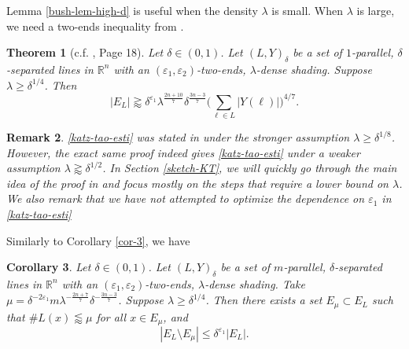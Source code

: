 \documentclass{amsart}
\numberwithin{equation}{section}
\newtheorem{theorem}{Theorem}[section]
\newtheorem{remark}[theorem]{Remark}
\newtheorem{corollary}[theorem]{Corollary}
\newcommand{\de}{\delta}
\newcommand{\e}{\varepsilon}
\newcommand{\la}{\lambda}
\newcommand{\ZR}{\mathbb{R}}
\begin{document}
Lemma \ref{bush-lem-high-d} is useful when the density $\la$ is small. 
When $\la$ is large, we need a two-ends inequality from \cite{Katz-Tao-Kakeya-maximal}.
\begin{theorem}[c.f. \cite{Katz-Tao-Kakeya-maximal}, Page 18]
\label{katz-tao-thm}
Let $\de\in(0,1)$.
Let $(L,Y)_\de$ be a set of $1$-parallel, $\de$-separated lines in $\ZR^n$ with an $(\e_1, \e_2)$-two-ends, $\la$-dense shading. 
Suppose $\la\geq \de^{1/4}$.
Then
\begin{equation}
\label{katz-tao-esti}
    |E_L|\gtrapprox \de^{\e_1} \la^\frac{2n+10}{7}\de^{\frac{3n-3}{7}}\Big(\sum_{\ell\in L}|Y(\ell)|\Big)^{4/7}.
\end{equation}
\end{theorem}
\begin{remark}
\rm
\eqref{katz-tao-esti} was stated in \cite{Katz-Tao-Kakeya-maximal} under the stronger assumption $\la\geq \de^{1/8}$.
However, the exact same proof indeed gives \eqref{katz-tao-esti} under a weaker assumption $\la\gtrapprox\de^{1/2}$. 
In Section \ref{sketch-KT}, we will quickly go through the main idea of the proof in \cite{Katz-Tao-Kakeya-maximal} and focus mostly on the steps that require a lower bound on $\la$.
We also remark that we have not attempted to optimize the dependence on $\e_1$ in \eqref{katz-tao-esti}
\end{remark}

Similarly to Corollary \ref{cor-3}, we have
\begin{corollary}
\label{cor-4}
Let $\de\in(0,1)$.
Let $(L,Y)_\de$ be a set of $m$-parallel, $\de$-separated lines in $\ZR^n$ with an $(\e_1, \e_2)$-two-ends, $\la$-dense shading. 
Take $\mu=\de^{-2\e_1}m\la^{-\frac{2n+7}{7}}\de^{-\frac{3n-3}{7}}$. 
Suppose $\la\geq \de^{1/4}$. 
Then there exists a set  $E_\mu\subset E_L$ such that $\# L(x)\lessapprox \mu$ for all $x\in E_\mu$, and
\begin{equation}
    |E_L\setminus E_\mu|\leq \de^{\e_1}|E_L|.
\end{equation}
\end{corollary}

\smallskip
\end{document}
